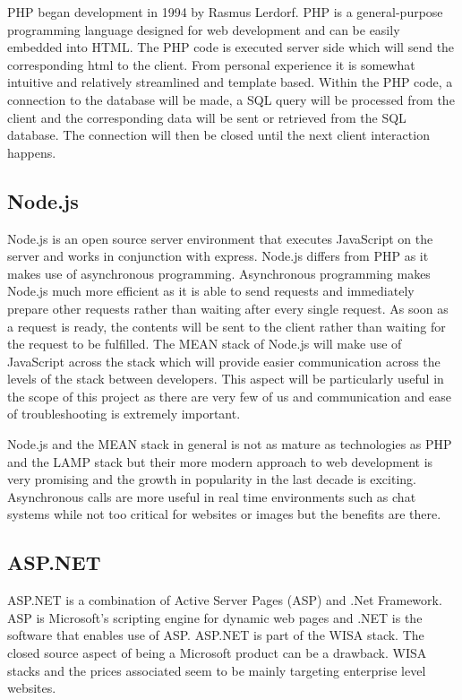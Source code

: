 \documentclass[12pt]{report}
\begin{document}
PHP began development in 1994 by Rasmus Lerdorf.   PHP is a general-purpose programming language designed for web development and can be easily embedded into HTML.  The PHP code is executed server side which will send the corresponding html to the client.  From personal experience it is somewhat intuitive and relatively streamlined and template based.  Within the PHP code, a connection to the database will be made, a SQL query will be processed from the client and the corresponding data will be sent or retrieved from the SQL database.  The connection will then be closed until the next client interaction happens.   

\subsection*{Node.js}

Node.js is an open source server environment that executes JavaScript on the server and works in conjunction with express.  Node.js differs from PHP as it makes use of asynchronous programming.  Asynchronous programming makes Node.js much more efficient as it is able to send requests and immediately prepare other requests rather than waiting after every single request.  As soon as a request is ready, the contents will be sent to the client rather than waiting for the request to be fulfilled.  The MEAN stack of Node.js will make use of JavaScript across the stack which will provide easier communication across the levels of the stack between developers.  This aspect will be particularly useful in the scope of this project as there are very few of us and communication and ease of troubleshooting is extremely important.

Node.js and the MEAN stack in general is not as mature as technologies as PHP and the LAMP stack but their more modern approach to web development is very promising and the growth in popularity in the last decade is exciting.  Asynchronous calls are more useful in real time environments such as chat systems while not too critical for websites or images but the benefits are there.  

\subsection*{ASP.NET}

ASP.NET is a combination of Active Server Pages (ASP) and .Net Framework.  ASP is Microsoft’s scripting engine for dynamic web pages and .NET is the software that enables use of ASP.  ASP.NET is part of the WISA stack.  The closed source aspect of being a Microsoft product can be a drawback.  WISA stacks and the prices associated seem to be mainly targeting enterprise level websites. 
\end{document}
